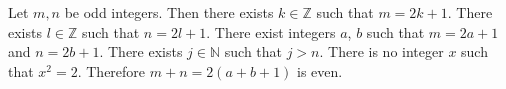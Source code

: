 Let $m, n$ be odd integers.
Then there exists $k \in \mathbb{Z}$ such that $m = 2k + 1$.
There exists $l \in \mathbb{Z}$ such that $n = 2l + 1$.
There exist integers $a$, $b$ such that $m = 2a + 1$ and $n = 2b + 1$.
There exists $j \in \mathbb{N}$ such that $j > n$.
There is no integer $x$ such that $x^{2} = 2$.
Therefore $m + n = 2(a + b + 1)$ is even.